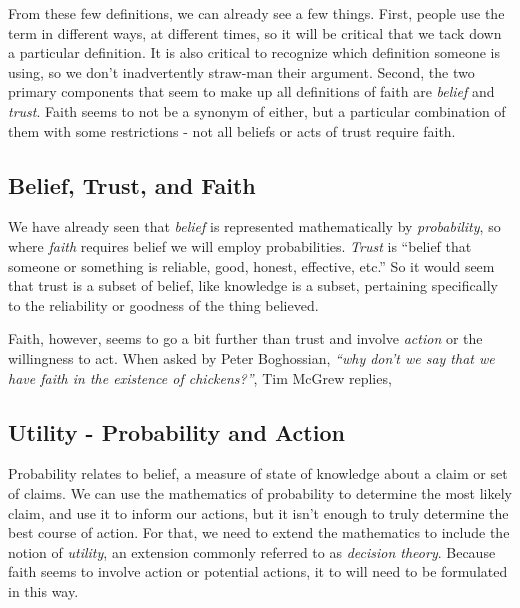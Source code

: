 \documentclass{tufte-book}
\begin{document}
From these few definitions, we can already see a few things. First,
people use the term in different ways, at different times, so it will be
critical that we tack down a particular definition. It is also critical
to recognize which definition someone is using, so we don't
inadvertently straw-man their argument. Second, the two primary
components that seem to make up all definitions of faith are
\emph{belief} and \emph{trust}. Faith seems to not be a synonym of
either, but a particular combination of them with some restrictions -
not all beliefs or acts of trust require faith.

\subsection{Belief, Trust, and Faith}

We have already seen that \emph{belief} is represented mathematically by
\emph{probability}, so where \emph{faith} requires belief we will employ
probabilities. \emph{Trust}\citep{MerriamWebster2009} is ``belief that
someone or something is reliable, good, honest, effective, etc.'' So it
would seem that trust is a subset of belief, like knowledge is a subset,
pertaining specifically to the reliability or goodness of the thing
believed.

Faith, however, seems to go a bit further than trust and involve
\emph{action} or the willingness to act. When asked by Peter Boghossian,
\emph{``why don't we say that we have faith in the existence of
chickens?''}, Tim McGrew replies,

\subsection{Utility - Probability and Action}

Probability relates to belief, a measure of state of knowledge about a
claim or set of claims. We can use the mathematics of probability to
determine the most likely claim, and use it to inform our actions, but
it isn't enough to truly determine the best course of action. For that,
we need to extend the mathematics to include the notion of
\emph{utility}, an extension commonly referred to as \emph{decision
theory}. Because faith seems to involve action or potential actions, it
to will need to be formulated in this way.
\end{document}
